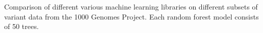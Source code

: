 \documentclass[11pt]{article}
\begin{document}
\begin{table}[!ht]
\begin{minipage}{\textwidth}
\begin{tabular}{|l|l|l|l|l|l|p{1cm}|}
\end{tabular}
\begin{flushleft} 
Comparison of different various machine learning libraries on different subsets of variant data 
from the 1000 Genomes Project.
Each random forest model consists of 50 trees.
\end{flushleft}
\label{table1}
\end{minipage}
\end{table}
\end{document}
